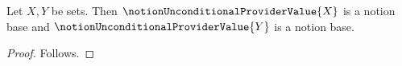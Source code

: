 

\begin{classification}\label{notion_bundle_undetermined}
    Let $X,Y$ be sets.
    Then $\notionUnconditionalProviderValue{X}$ is a notion base and
    $\notionUnconditionalProviderValue{Y}$ is a notion base.
\end{classification}
\begin{proof}
    Follows.
\end{proof}
